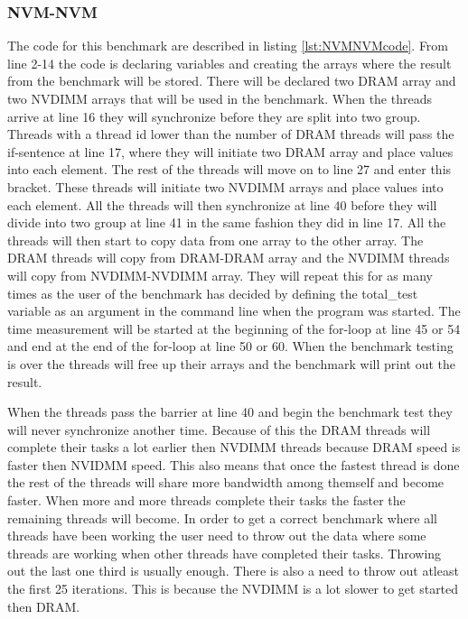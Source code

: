 \documentclass[12pt,a4paper,USenglish]{article}      %
\begin{document}
\subsubsection{NVM-NVM}
\label{section:NVM-NVM}
The code for this benchmark are described in listing \ref{lst:NVMNVMcode}.
From line 2-14 the code is declaring variables and creating the arrays where the result from the benchmark will be stored. There will be declared two DRAM array and two NVDIMM arrays that will be used in the benchmark.
When the threads arrive at line 16 they will synchronize before they are split into two group. Threads with a thread id lower than the number of DRAM threads will pass the if-sentence at line 17, where they will initiate two DRAM array and place values into each element.
The rest of the threads will move on to line 27 and enter this bracket. These threads will initiate two NVDIMM arrays and place values into each element.
All the threads will then synchronize at line 40 before they will divide into two group at line 41 in the same fashion they did in line 17. All the threads will then start to copy data from one array to the other array. The DRAM threads will copy from DRAM-DRAM array and the NVDIMM threads will copy from NVDIMM-NVDIMM array. They will repeat this for as many times as the user of the benchmark has decided by defining the total\_test variable as an argument in the command line when the program was started. The time measurement will be started at the beginning of the for-loop at line 45 or 54 and end at the end of the for-loop at line 50 or 60.
When the benchmark testing is over the threads will free up their arrays and the benchmark will print out the result. 

When the threads pass the barrier at line 40 and begin the benchmark test they will never synchronize another time. Because of this the DRAM threads will complete their tasks a lot earlier then NVDIMM threads because DRAM speed is faster then NVIDMM speed. This also means that once the fastest thread is done the rest of the threads will share more bandwidth among  themself and become faster. When more and more threads complete their tasks the faster the remaining threads will become.
In order to get a correct benchmark where all threads have been working the user need to throw out the data where some threads are working when other threads have completed their tasks. Throwing out the last one third is usually enough.
There is also a need to throw out atleast the first 25 iterations. This is because the NVDIMM is a lot slower to get started then DRAM. 
\end{document}
